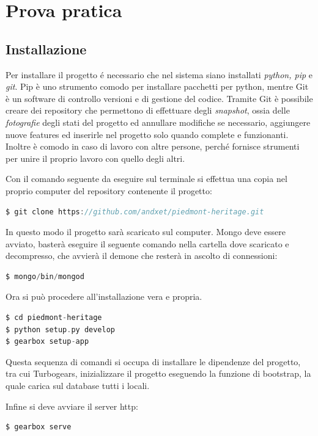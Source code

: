 \chapter{Prova pratica}%

\section{Installazione}
Per installare il progetto \'e necessario che nel sistema siano installati \emph{python, pip} e \emph{git}. Pip è uno strumento comodo per installare pacchetti per python, mentre Git è un software di controllo versioni e di gestione del codice. Tramite Git è possibile creare dei repository che permettono di effettuare degli \emph{snapshot}, ossia delle \emph{fotografie} degli stati del progetto ed annullare modifiche se necessario, aggiungere nuove features ed inserirle nel progetto solo quando complete e funzionanti. Inoltre è comodo in caso di lavoro con altre persone, perché fornisce strumenti per unire il proprio lavoro con quello degli altri.

Con il comando seguente da eseguire sul terminale si effettua una copia nel proprio computer del repository contenente il progetto:

\begin{lstlisting}[language=c]
$ git clone https://github.com/andxet/piedmont-heritage.git
\end{lstlisting}

In questo modo il progetto sarà scaricato sul computer. Mongo deve essere avviato, basterà eseguire il seguente comando nella cartella dove scaricato e decompresso, che avvierà il demone che resterà in ascolto di connessioni:

\begin{lstlisting}[language=c]
$ mongo/bin/mongod
\end{lstlisting} 

Ora si può procedere all'installazione vera e propria.
\begin{lstlisting}[language=c]
$ cd piedmont-heritage
$ python setup.py develop
$ gearbox setup-app
\end{lstlisting} 

Questa sequenza di comandi si occupa di installare le dipendenze del progetto, tra cui Turbogears, inizializzare il progetto eseguendo la funzione di bootstrap, la quale carica sul database tutti i locali.

Infine si deve avviare il server http:
\begin{lstlisting}[language=c]
$ gearbox serve
\end{lstlisting} 


